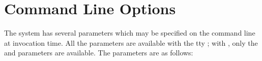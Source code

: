 %
%
%
%
%
\chapter{{\eclipse} Command Line Options}

The {\eclipse} system has several parameters which may be specified on the
command line at invocation time. All the parameters are available with
the tty ; with , only the 
and 
parameters are available.
The parameters are as follows:

